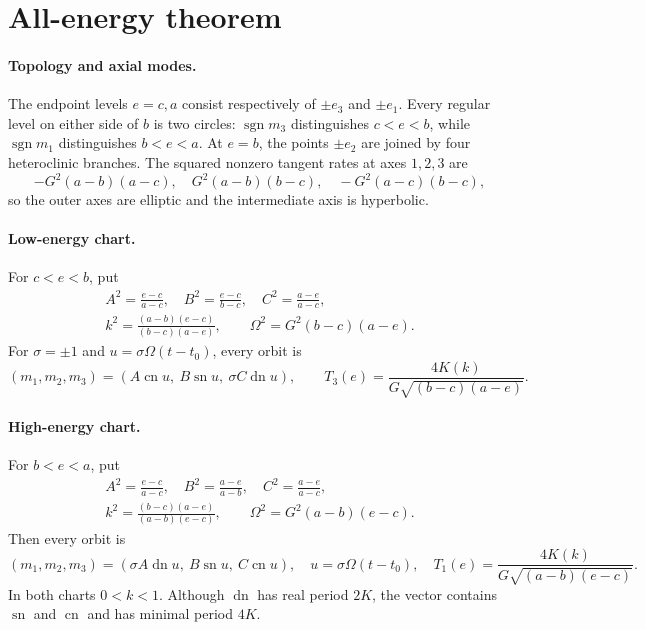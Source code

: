 \documentclass[8pt]{extarticle}
\newcommand{\sn}{\operatorname{sn}}
\newcommand{\cn}{\operatorname{cn}}
\newcommand{\dn}{\operatorname{dn}}
\begin{document}
\section{All-energy theorem}
\paragraph{Topology and axial modes.}
The endpoint levels $e=c,a$ consist respectively of $\pm e_3$ and
$\pm e_1$.  Every regular level on either side of $b$ is two circles:
$\operatorname{sgn}m_3$ distinguishes $c<e<b$, while
$\operatorname{sgn}m_1$ distinguishes $b<e<a$.  At $e=b$, the points
$\pm e_2$ are joined by four heteroclinic branches.  The squared nonzero
tangent rates at axes $1,2,3$ are
\begin{equation}
 -G^2(a-b)(a-c),\quad G^2(a-b)(b-c),\quad
 -G^2(a-c)(b-c),                                      \tag{2}
\end{equation}
so the outer axes are elliptic and the intermediate axis is hyperbolic.

\paragraph{Low-energy chart.}
For $c<e<b$, put
\[
\begin{gathered}
 A^2=\frac{e-c}{a-c},\quad B^2=\frac{e-c}{b-c},\quad
 C^2=\frac{a-e}{a-c},\\
 k^2=\frac{(a-b)(e-c)}{(b-c)(a-e)},\qquad
\Omega^2=G^2(b-c)(a-e).
\end{gathered}
\]
For $\sigma=\pm1$ and $u=\sigma\Omega(t-t_0)$, every orbit is
\begin{equation}
 (m_1,m_2,m_3)=(A\cn u,\ B\sn u,\ \sigma C\dn u),
 \qquad T_3(e)=\frac{4K(k)}{G\sqrt{(b-c)(a-e)}}.       \tag{3}
\end{equation}

\paragraph{High-energy chart.}
For $b<e<a$, put
\[
\begin{gathered}
 A^2=\frac{e-c}{a-c},\quad B^2=\frac{a-e}{a-b},\quad
 C^2=\frac{a-e}{a-c},\\
 k^2=\frac{(b-c)(a-e)}{(a-b)(e-c)},\qquad
\Omega^2=G^2(a-b)(e-c).
\end{gathered}
\]
Then every orbit is
\begin{equation}
 (m_1,m_2,m_3)=(\sigma A\dn u,\ B\sn u,\ C\cn u),
 \quad u=\sigma\Omega(t-t_0),\quad
 T_1(e)=\frac{4K(k)}{G\sqrt{(a-b)(e-c)}}.             \tag{4}
\end{equation}
In both charts $0<k<1$.  Although $\dn$ has real period $2K$, the vector
contains $\sn$ and $\cn$ and has minimal period $4K$.
\end{document}
